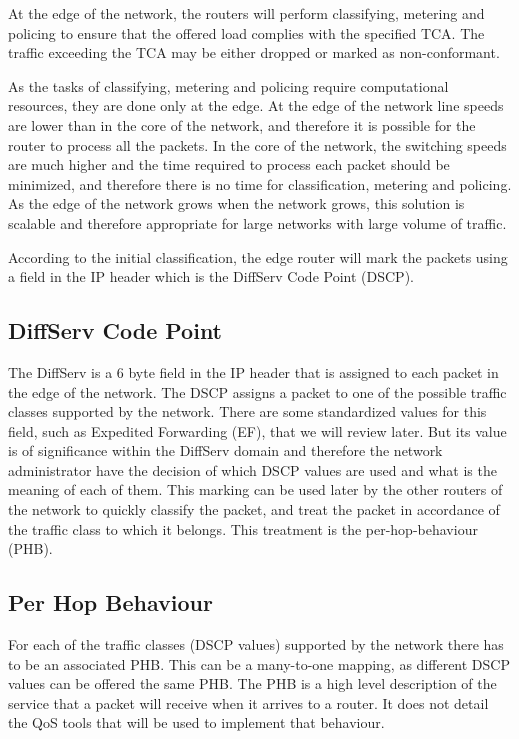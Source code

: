 At the edge of the network, the routers will perform classifying, metering and policing to ensure that the offered load complies with the specified TCA.
The traffic exceeding the TCA may be either dropped or marked as non-conformant.

As the tasks of classifying, metering and policing require computational resources, they are done only at the edge.
At the edge of the network line speeds are lower than in the core of the network, and therefore it is possible for the router to process all the packets.
In the core of the network, the switching speeds are much higher and the time required to process each packet should be minimized, and therefore there is no time for classification, metering and policing.
As the edge of the network grows when the network grows, this solution is scalable and therefore appropriate for large networks with large volume of traffic.

According to the initial classification, the edge router will mark the packets using a field in the IP header which is the DiffServ Code Point (DSCP).

\subsection{DiffServ Code Point}

The DiffServ is a 6 byte field in the IP header that is assigned to each packet in the edge of the network.
The DSCP assigns a packet to one of the possible traffic classes supported by the network.
There are some standardized values for this field, such as Expedited Forwarding (EF), that we will review later.
But its value is of significance within the DiffServ domain and therefore the network administrator have the decision of which DSCP values are used and what is the meaning of each of them.
This marking can be used later by the other routers of the network to quickly classify the packet, and treat the packet in accordance of the traffic class to which it belongs.
This treatment is the per-hop-behaviour (PHB).

\subsection{Per Hop Behaviour}

For each of the traffic classes (DSCP values) supported by the network there has to be an associated PHB.
This can be a many-to-one mapping, as different DSCP values can be offered the same PHB.
The PHB is a high level description of the service that a packet will receive when it arrives to a router.
It does not detail the QoS tools that will be used to implement that behaviour.


